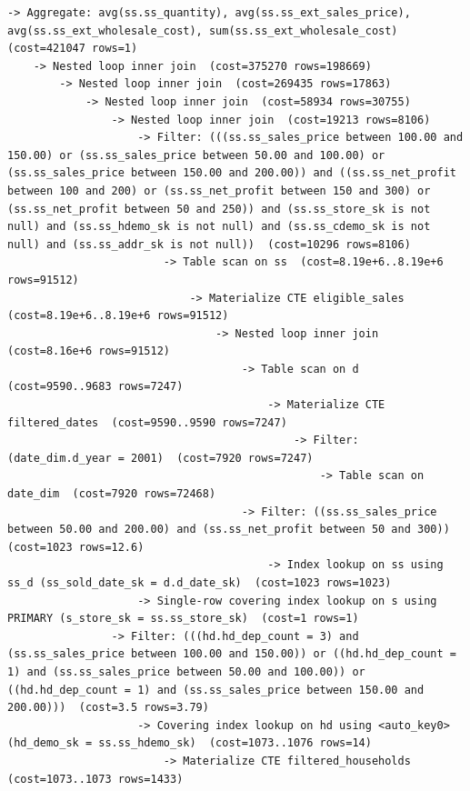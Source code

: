 \documentclass{ULBreport}
\begin{document}
\begin{lstlisting}[caption={Optimised \texttt{EXPLAIN FORMAT=TREE} on SF8 for Query 13}, label={lst:q13_explain_opt}, basicstyle=\ttfamily\scriptsize, breaklines=true, frame=single]
-> Aggregate: avg(ss.ss_quantity), avg(ss.ss_ext_sales_price), avg(ss.ss_ext_wholesale_cost), sum(ss.ss_ext_wholesale_cost)  (cost=421047 rows=1)
    -> Nested loop inner join  (cost=375270 rows=198669)
        -> Nested loop inner join  (cost=269435 rows=17863)
            -> Nested loop inner join  (cost=58934 rows=30755)
                -> Nested loop inner join  (cost=19213 rows=8106)
                    -> Filter: (((ss.ss_sales_price between 100.00 and 150.00) or (ss.ss_sales_price between 50.00 and 100.00) or (ss.ss_sales_price between 150.00 and 200.00)) and ((ss.ss_net_profit between 100 and 200) or (ss.ss_net_profit between 150 and 300) or (ss.ss_net_profit between 50 and 250)) and (ss.ss_store_sk is not null) and (ss.ss_hdemo_sk is not null) and (ss.ss_cdemo_sk is not null) and (ss.ss_addr_sk is not null))  (cost=10296 rows=8106)
                        -> Table scan on ss  (cost=8.19e+6..8.19e+6 rows=91512)
                            -> Materialize CTE eligible_sales  (cost=8.19e+6..8.19e+6 rows=91512)
                                -> Nested loop inner join  (cost=8.16e+6 rows=91512)
                                    -> Table scan on d  (cost=9590..9683 rows=7247)
                                        -> Materialize CTE filtered_dates  (cost=9590..9590 rows=7247)
                                            -> Filter: (date_dim.d_year = 2001)  (cost=7920 rows=7247)
                                                -> Table scan on date_dim  (cost=7920 rows=72468)
                                    -> Filter: ((ss.ss_sales_price between 50.00 and 200.00) and (ss.ss_net_profit between 50 and 300))  (cost=1023 rows=12.6)
                                        -> Index lookup on ss using ss_d (ss_sold_date_sk = d.d_date_sk)  (cost=1023 rows=1023)
                    -> Single-row covering index lookup on s using PRIMARY (s_store_sk = ss.ss_store_sk)  (cost=1 rows=1)
                -> Filter: (((hd.hd_dep_count = 3) and (ss.ss_sales_price between 100.00 and 150.00)) or ((hd.hd_dep_count = 1) and (ss.ss_sales_price between 50.00 and 100.00)) or ((hd.hd_dep_count = 1) and (ss.ss_sales_price between 150.00 and 200.00)))  (cost=3.5 rows=3.79)
                    -> Covering index lookup on hd using <auto_key0> (hd_demo_sk = ss.ss_hdemo_sk)  (cost=1073..1076 rows=14)
                        -> Materialize CTE filtered_households  (cost=1073..1073 rows=1433)

\end{lstlisting}
\end{document}
